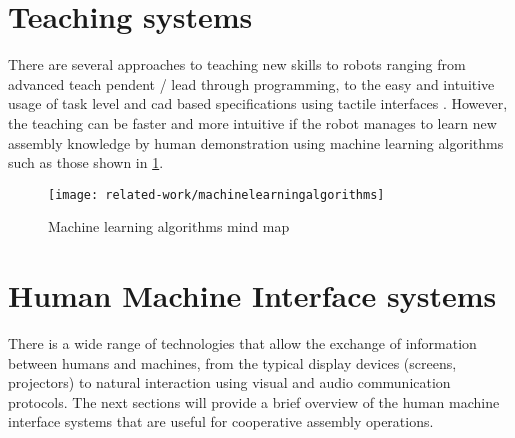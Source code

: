 \section{Teaching systems}

There are several approaches to teaching new skills to robots ranging from advanced teach pendent / lead through programming, to the easy and intuitive usage of task level and \gls{cad} based specifications using tactile interfaces \cite{Perzylo2015a}. However, the teaching can be faster and more intuitive if the robot manages to learn new assembly knowledge \cite{tensorflow} by human demonstration \cite{Argall2009,Hamabe2015,Wang2015} using machine learning algorithms such as those shown in \cref{fig:machinelearningalgorithms}.

\begin{figure}[H]
	\centering
	\texttt{[image: related-work/machinelearningalgorithms]}
	\caption[Machine learning algorithms mind map]{Machine learning algorithms mind map\protect\footnotemark}
	\label{fig:machinelearningalgorithms}
\end{figure}




\section{Human Machine Interface systems}

There is a wide range of technologies that allow the exchange of information between humans and machines\cite{Goodrich2008}, from the typical display devices (screens, projectors) to natural interaction using visual and audio \cite{Yan2014} communication protocols. The next sections will provide a brief overview of the human machine interface systems that are useful for cooperative assembly operations.

